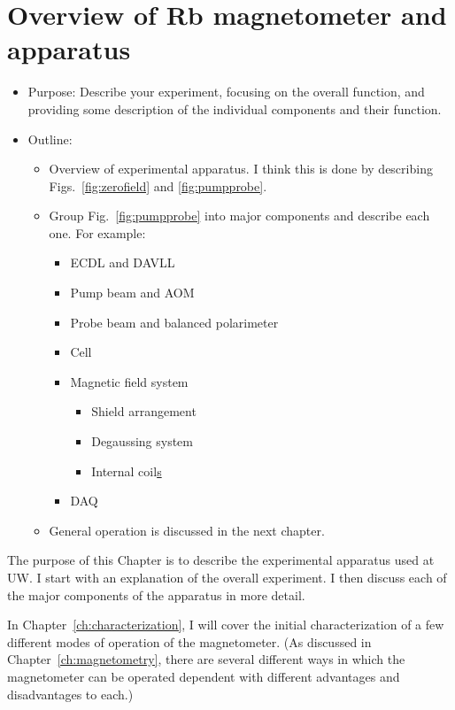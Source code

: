 \chapter{Overview of Rb magnetometer and apparatus}

\begin{itemize}
\item Purpose: Describe your experiment, focusing on the overall
  function, and providing some description of the individual
  components and their function.
\item Outline:
  \begin{itemize}
  \item Overview of experimental apparatus.  I think this is done by
    describing Figs.~\ref{fig:zerofield} and \ref{fig:pumpprobe}.
  \item Group Fig.~\ref{fig:pumpprobe} into major components and
    describe each one.  For example:
    \begin{itemize}
      \item ECDL and DAVLL
      \item Pump beam and AOM
      \item Probe beam and balanced polarimeter
      \item Cell
      \item Magnetic field system
        \begin{itemize}
        \item Shield arrangement
        \item Degaussing system
        \item Internal coil\underline{s}
        \end{itemize}
      \item DAQ
    \end{itemize}
  \item General operation is discussed in the next chapter.
  \end{itemize}
\end{itemize}

The purpose of this Chapter is to describe the experimental apparatus
used at UW.  I start with an explanation of the overall experiment.  I
then discuss each of the major components of the apparatus in more
detail.



In Chapter~\ref{ch:characterization}, I will cover the initial
characterization of a few different modes of operation of the
magnetometer.  (As discussed in Chapter~\ref{ch:magnetometry}, there
are several different ways in which the magnetometer can be operated
dependent with different advantages and disadvantages to each.)

